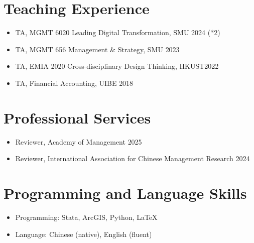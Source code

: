 \documentclass[a4paper,10pt]{article}
\begin{document}
\section{Teaching Experience}

\begin{itemize}[itemsep=2pt,label=$\bullet$]
    \item {TA, MGMT 6020 Leading Digital Transformation, SMU } \hfill{2024 (*2)}
    \item {TA, MGMT 656 Management \& Strategy, SMU } \hfill{2023}
    \item {TA, EMIA 2020 Cross-disciplinary Design Thinking, HKUST}\hfill{2022}
    \item {TA, Financial Accounting, UIBE} \hfill{2018}
\end{itemize}

\section{Professional Services}

\begin{itemize}[itemsep=2pt,label=$\bullet$]
    \item {Reviewer, Academy of Management} \hfill{2025}
    \item {Reviewer, International Association for Chinese Management Research} \hfill{2024}
\end{itemize}
\section{Programming and Language Skills}

\begin{itemize}[itemsep=2pt,label=$\bullet$]
    \item {Programming: Stata, ArcGIS, Python, LaTeX}
    \item {Language: Chinese (native), English (fluent) }
\end{itemize}
\end{document}
